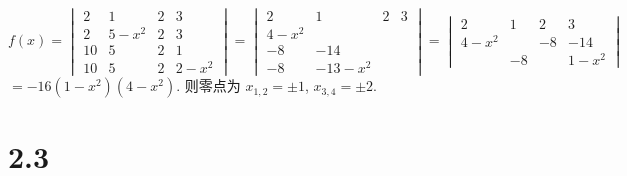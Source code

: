 	\paragraph{} %
		$f(x) = \begin{vmatrix}
				2  & 1     & 2 & 3     \\
				2  & 5-x^2 & 2 & 3     \\
				10 & 5     & 2 & 1     \\
				10 & 5     & 2 & 2-x^2
			\end{vmatrix} = \begin{vmatrix}
				2     & 1       & 2 & 3 \\
				4-x^2 &         &   &   \\
				-8    & -14     &   &   \\
				-8    & -13-x^2 &   &
			\end{vmatrix} = \begin{vmatrix}
				2     & 1  & 2  & 3     \\
				4-x^2 &    & -8 & -14   \\
				      & -8 &    & 1-x^2
			\end{vmatrix}$
		$= -16(1-x^2)(4-x^2)$.
		则零点为 $x_{1,2} = \pm 1$, $x_{3,4} = \pm 2$.

\section{2.3}


\subsection{} %


